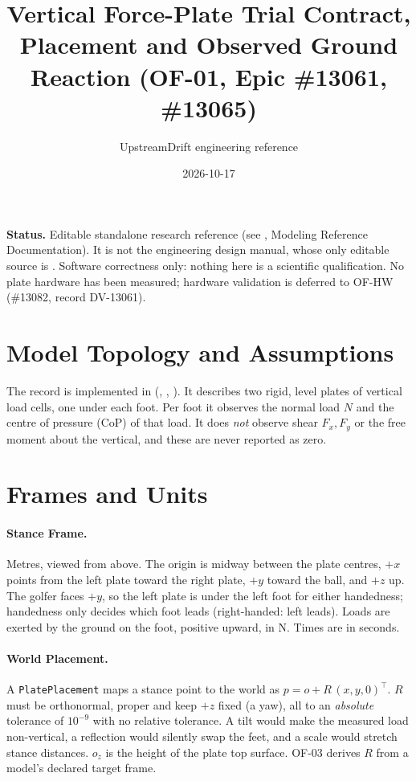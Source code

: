 \documentclass[11pt]{article}
\title{Vertical Force-Plate Trial Contract, Placement and Observed Ground Reaction (OF-01, Epic \#13061, \#13065)}
\author{UpstreamDrift engineering reference}
\date{2026-10-17}
\begin{document}
\maketitle

\noindent\textbf{Status.} Editable standalone research reference (see
, Modeling Reference Documentation). It is not the
engineering design manual, whose only editable source is
. Software correctness only: nothing here is a
scientific qualification. No plate hardware has been measured; hardware
validation is deferred to OF-HW (\#13082, record DV-13061).

\section{Model Topology and Assumptions}

The record is implemented in 
(, , ). It describes
two rigid, level plates of vertical load cells, one under each foot. Per foot
it observes the normal load $N$ and the centre of pressure (CoP) of that
load. It does \emph{not} observe shear $F_x, F_y$ or the free moment about the
vertical, and these are never reported as zero.

\section{Frames and Units}

\paragraph{Stance Frame.} Metres, viewed from above. The origin is midway
between the plate centres, $+x$ points from the left plate toward the right
plate, $+y$ toward the ball, and $+z$ up. The golfer faces $+y$, so the left
plate is under the left foot for either handedness; handedness only decides
which foot leads (right-handed: left leads). Loads are exerted by the ground
on the foot, positive upward, in N. Times are in seconds.

\paragraph{World Placement.} A \texttt{PlatePlacement} maps a stance point to
the world as $p = o + R\,(x, y, 0)^\top$. $R$ must be orthonormal, proper and
keep $+z$ fixed (a yaw), all to an \emph{absolute} tolerance of $10^{-9}$ with
no relative tolerance. A tilt would make the measured load non-vertical, a
reflection would silently swap the feet, and a scale would stretch stance
distances. $o_z$ is the height of the plate top surface. OF-03 derives $R$
from a model's declared target frame.
\end{document}
